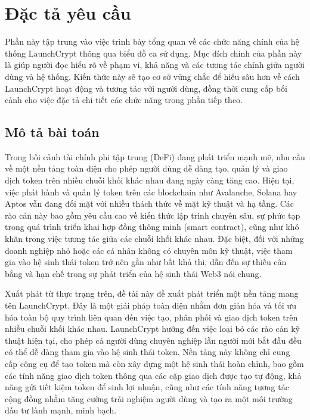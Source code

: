 \section{Đặc tả yêu cầu}
Phần này tập trung vào việc trình bày tổng quan về các chức năng chính của hệ
thống LaunchCrypt thông qua biểu đồ ca sử dụng. Mục đích chính của phần này là
giúp người đọc hiểu rõ về phạm vi, khả năng và các tương tác chính giữa người
dùng và hệ thống. Kiến thức này sẽ tạo cơ sở vững chắc để hiểu sâu hơn về cách
LaunchCrypt hoạt động và tương tác với người dùng, đồng thời cung cấp bối cảnh
cho việc đặc tả chi tiết các chức năng trong phần tiếp theo.

\subsection{Mô tả bài toán}
\hspace{1cm}Trong bối cảnh tài chính phi tập trung (DeFi) đang phát triển mạnh
mẽ, nhu cầu về một nền tảng toàn diện cho phép người dùng dễ dàng tạo, quản lý
và giao dịch token trên nhiều chuỗi khối khác nhau đang ngày càng tăng cao.
Hiện tại, việc phát hành và quản lý token trên các blockchain như Avalanche,
Solana hay Aptos vẫn đang đối mặt với nhiều thách thức về mặt kỹ thuật và hạ
tầng. Các rào cản này bao gồm yêu cầu cao về kiến thức lập trình chuyên sâu, sự
phức tạp trong quá trình triển khai hợp đồng thông minh (smart contract), cũng
như khó khăn trong việc tương tác giữa các chuỗi khối khác nhau. Đặc biệt, đối
với những doanh nghiệp nhỏ hoặc các cá nhân không có chuyên môn kỹ thuật, việc
tham gia vào hệ sinh thái token trở nên gần như bất khả thi, dẫn đến sự thiếu
cân bằng và hạn chế trong sự phát triển của hệ sinh thái Web3 nói chung.

Xuất phát từ thực trạng trên, đề tài này đề xuất phát triển một nền tảng
mang tên LaunchCrypt. Đây là một giải pháp toàn diện nhằm đơn giản hóa và
tối ưu hóa toàn bộ quy trình liên quan đến việc tạo, phân phối và giao dịch
token trên nhiều chuỗi khối khác nhau. LaunchCrypt hướng đến việc loại bỏ các
rào cản kỹ thuật hiện tại, cho phép cả người dùng chuyên nghiệp lẫn người mới
bắt đầu đều có thể dễ dàng tham gia vào hệ sinh thái token. Nền tảng này không
chỉ cung cấp công cụ để tạo token mà còn xây dựng một hệ sinh thái hoàn chỉnh,
bao gồm các tính năng giao dịch token thông qua các cặp giao dịch được tạo tự
động, khả năng gửi tiết kiệm token để sinh lợi nhuận, cũng như các tính năng
tương tác cộng đồng nhằm tăng cường trải nghiệm người dùng và tạo ra một môi
trường đầu tư lành mạnh, minh bạch.

